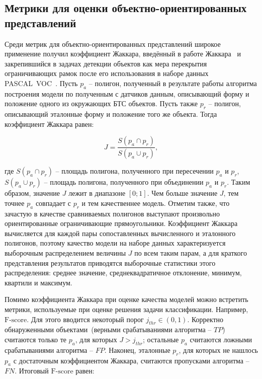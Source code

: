 \subsection{Метрики для оценки объектно-ориентированных представлений}

Среди метрик для объектно-ориентированных представлений широкое применение получил коэффициент Жаккара, введённый в работе Жаккара~\cite{jaccard1901distribution} и закрепившийся в задачах детекции объектов как мера перекрытия ограничивающих рамок после его использования в наборе данных PASCAL~VOC~\autocite{everingham2010pascal}. Пусть $p_a$ -- полигон, полученный в результате работы алгоритма построения модели по полученным с датчиков данным, описывающий форму и положение одного из окружающих БТС объектов. Пусть также $p_r$ -- полигон, описывающий эталонные форму и положение того же объекта. Тогда коэффициент Жаккара равен:

\begin{equation}
	J = \dfrac{S(p_a\cap p_r)}{S(p_a \cup p_r)},
	\label{eq:jaccard}
\end{equation}

где $S(p_a\cap p_r)$ -- площадь полигона, полученного при пересечении $p_a$ и $p_r$, $S(p_a \cup p_r)$ -- площадь полигона, полученного при объединении $p_a$ и $p_r$. Таким образом, значение $J$ лежит в диапазоне $\left[0;1\right]$. Чем больше значение $J$, тем точнее $p_a$ совпадает с $p_r$ и тем качественнее модель. Отметим также, что зачастую в качестве сравниваемых полигонов выступают произвольно ориентированные ограничивающие прямоугольники. Коэффициент Жаккара вычисляется для каждой пары сопоставленных вычисленного и эталонного полигонов, поэтому качество модели на наборе данных характеризуется выборочным распределением величины $J$ по всем таким парам, а для краткого представления результатов приводятся выборочные статистики этого распределения: среднее значение, среднеквадратичное отклонение, минимум, квартили и максимум.

Помимо коэффициента Жаккара при оценке качества моделей можно встретить метрики, используемые при оценке решения задачи классификации. Например, $\text{F-score}$. Для этого вводится некоторый порог $j_{thr}\in(0,1)$. Корректно обнаруженными объектами~(верными срабатываниями алгоритма -- $TP$) считаются только те $p_a$, для которых $J > j_{thr}$; остальные $p_a$ считаются ложными срабатываниями алгоритма -- $FP$. Наконец, эталонные $p_r$, для которых не нашлось $p_a$ с достаточным коэффициентом Жаккара, считаются пропусками алгоритма -- $FN$. Итоговый $\text{F-score}$ равен:

